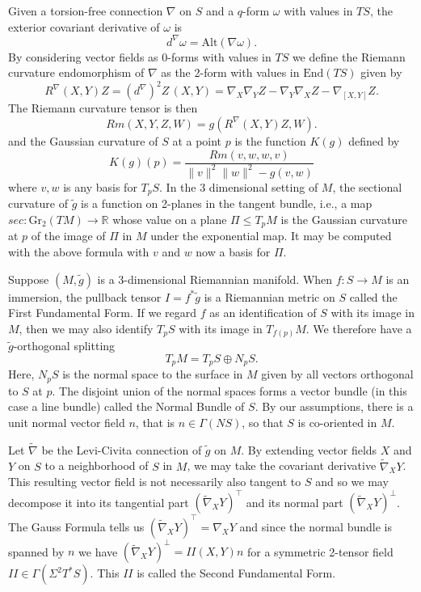 \documentclass{amsart}
\newcommand{\R}{\mathbb{R}}
\newcommand{\two}{I\!\!I}
\begin{document}
Given a torsion-free connection $\nabla$ on $S$ and a $q$-form $\omega$ with values in $TS$, the exterior covariant derivative of $\omega$ is 
\[
d^\nabla \omega = \mathrm{Alt}(\nabla \omega).
\]
By considering vector fields as 0-forms with values in $TS$ we define the Riemann curvature endomorphism of $\nabla$ as the 2-form with values in $\mathrm{End}(TS)$ given by  
\[
R^{\nabla}(X,Y)Z 
= (d^\nabla)^2 Z \, (X,Y)
= \nabla_X \nabla_Y Z - \nabla_Y \nabla_X Z - \nabla_{[X,Y]}Z.
\]
The Riemann curvature tensor is then 
\[
Rm(X,Y,Z,W) = g(R^{\nabla}(X,Y)Z,W).
\]
and the Gaussian curvature of $S$ at a point $p$ is the function $K(g)$ defined by 
\[
K(g)(p) = \frac{Rm(v,w,w,v)}{\|v\|^2\|w\|^2 - g(v,w)}
\]
where $v,w$ is any basis for $T_pS$.
In the 3 dimensional setting of $M$, the sectional curvature of $\tilde{g}$ is a function on 2-planes in the tangent bundle, i.e., a map $sec: \mathrm{Gr}_2(TM) \to \R$ whose value on a plane $\Pi \leq T_pM$ is the Gaussian curvature at $p$ of the image of $\Pi$ in $M$ under the exponential map. 
It may be computed with the above formula with $v$ and $w$ now a basis for $\Pi$.

Suppose $(M,\tilde{g})$ is a 3-dimensional Riemannian manifold. 
When $f: S \to M$ is an immersion, the pullback tensor $I = f^*\tilde{g}$ is a Riemannian metric on $S$ called the First Fundamental Form. 
If we regard $f$ as an identification of $S$ with its image in $M$, then we may also identify $T_pS$ with its image in $T_{f(p)}M$.
We therefore have a $\tilde{g}$-orthogonal splitting
\[
T_pM = T_pS \oplus N_pS.
\]
Here, $N_pS$ is the normal space to the surface in $M$ given by all vectors orthogonal to $S$ at $p$.
The disjoint union of the normal spaces forms a vector bundle (in this case a line bundle) called the Normal Bundle of $S$. 
By our assumptions, there is a unit normal vector field $n$, that is $n \in \Gamma(NS)$, so that $S$ is co-oriented in $M$.

Let $\widetilde{\nabla}$ be the Levi-Civita connection of $\tilde{g}$ on $M$.
By extending vector fields $X$ and $Y$ on $S$ to a neighborhood of $S$ in $M$, we may take the covariant derivative $\widetilde{\nabla}_X Y$.
This resulting vector field is not necessarily also tangent to $S$ and so we may decompose it into its tangential part $(\widetilde{\nabla}_X Y)^\top$ and its normal part $(\widetilde{\nabla}_X Y)^\perp$.
The Gauss Formula tells us $(\widetilde{\nabla}_X Y)^\top = \nabla_X Y$ and since the normal bundle is spanned by $n$ we have $(\widetilde{\nabla}_X Y)^\perp = \two(X,Y)n$ for a symmetric 2-tensor field $\two \in \Gamma(\Sigma^2T^*S)$.
This $\two$ is called the Second Fundamental Form.
\end{document}
